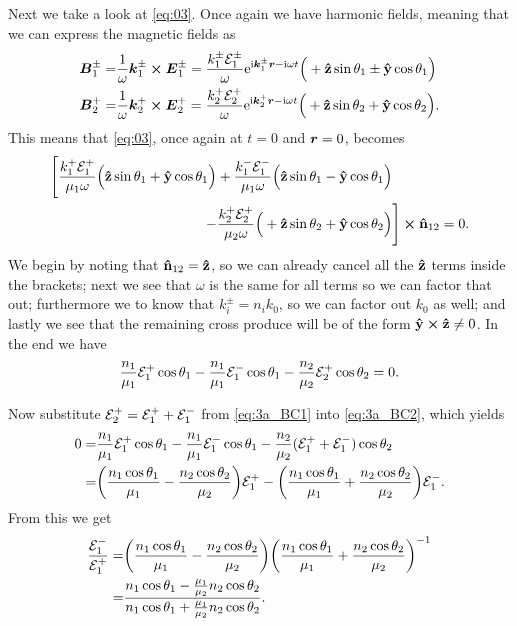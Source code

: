 \documentclass[11pt,letter, swedish, english
]{article}
\begin{document}
Next we take a look at \eqref{eq:03}. Once again we have harmonic
fields, meaning that we can express the magnetic fields as
\begin{equation}
\begin{aligned}
\vb*B_1^\pm=&\frac{1}{\omega}\vb*k_1^\pm\cross\vb*E_1^\pm
=\frac{k_1^\pm\mathcal{E}_1^\pm}{\omega}
\mathrm{e}^{\mathrm{i} \vb*k_1^\pm\vb*r -\mathrm{i}\omega t}
\Big(+\vu{z}\sin\theta_1 \pm \vu{y}\cos\theta_1 \Big)
\\
\vb*B_2^+=&\frac{1}{\omega}\vb*{k}_2^+\cross\vb*E_2^+
=\frac{k_2^+\mathcal{E}_2^+}{\omega}
\mathrm{e}^{\mathrm{i} \vb*k_2^+\vb*r -\mathrm{i}\omega t}
\Big(+\vu{z}\sin\theta_2 + \vu{y}\cos\theta_2 \Big).
\end{aligned}
\end{equation}
This means that \eqref{eq:03}, once again at $t=0$ and $\vb*r=0$,
becomes 
\begin{equation}
\begin{aligned}
\Bigg[\frac{k_1^+\mathcal{E}_1^+}{\mu_1\omega}
\Big(\vu{z}\sin\theta_1 + \vu{y}\cos\theta_1 \Big)
+\frac{k_1^-\mathcal{E}_1^-}{\mu_1\omega}
\Big(\vu{z}\sin\theta_1 - \vu{y}\cos\theta_1 \Big)&\\
-\frac{k_2^+\mathcal{E}_2^+}{\mu_2\omega}
\Big(+\vu{z}\sin\theta_2 + \vu{y}\cos\theta_2 \Big)
&\Bigg]
\cross\vu{n}_{12} = 0.
\end{aligned}
\end{equation}
We begin by noting that $\vu{n}_{12}=\vu{z}$, so we can already cancel
all the $\vu{z}$ terms inside the brackets; next we see that $\omega$
is the same for all terms so we can factor that out; furthermore we
to know that $k_i^\pm = n_ik_0$, so we can factor out $k_0$ as
well; and lastly we see that the remaining cross produce will be of
the form $\vu{y}\cross\vu{z}\neq0$. In the end we have
\begin{equation}\label{eq:3a_BC2}
\frac{n_1}{\mu_1}{\mathcal{E}_1^+}\cos\theta_1 
-\frac{n_1}{\mu_1}{\mathcal{E}_1^-}\cos\theta_1
-\frac{n_2}{\mu_2}{\mathcal{E}_2^+}\cos\theta_2 
 = 0.
\end{equation}

Now substitute ${\mathcal{E}_2^+} = {\mathcal{E}_1^+}+{\mathcal{E}_1^-}$ from \eqref{eq:3a_BC1} into
\eqref{eq:3a_BC2}, which yields
\begin{equation}
\begin{aligned}
0 =& 
\frac{n_1}{\mu_1}{\mathcal{E}_1^+}\cos\theta_1 
-\frac{n_1}{\mu_1}{\mathcal{E}_1^-}\cos\theta_1
-\frac{n_2}{\mu_2}({\mathcal{E}_1^+}+{\mathcal{E}_1^-})
\cos\theta_2 
\\ =&
\qty(\frac{n_1\cos\theta_1}{\mu_1}-\frac{n_2\cos\theta_2}{\mu_2}){\mathcal{E}_1^+}
-\qty(\frac{n_1\cos\theta_1}{\mu_1}+\frac{n_2\cos\theta_2}{\mu_2}){\mathcal{E}_1^-}.
\end{aligned}
\end{equation}
From this we get
\begin{equation}
\begin{aligned}
\frac{{\mathcal{E}_1^-}}{{\mathcal{E}_1^+}}=&
\qty(\frac{n_1\cos\theta_1}{\mu_1}-\frac{n_2\cos\theta_2}{\mu_2})
\qty(\frac{n_1\cos\theta_1}{\mu_1}+\frac{n_2\cos\theta_2}{\mu_2})^{-1}\\
=&\frac{n_1\cos\theta_1 - \frac{\mu_1}{\mu_2}n_2\cos\theta_2}
{n_1\cos\theta_1 + \frac{\mu_1}{\mu_2}n_2\cos\theta_2}.
\end{aligned}
\end{equation}
\end{document}
